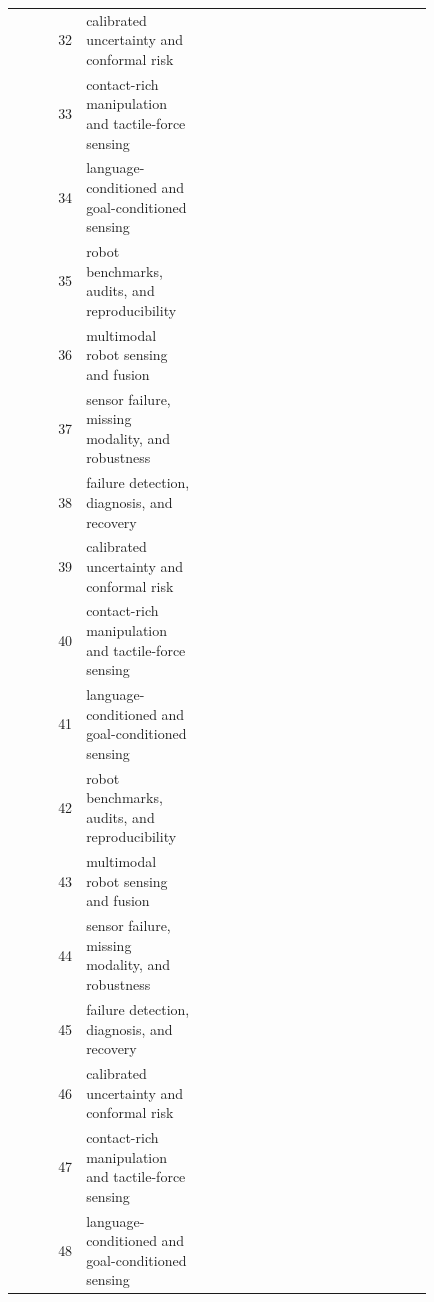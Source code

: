 \documentclass{article}
\begin{document}
\begin{longtable}{@{}r p{0.28\linewidth} p{0.55\linewidth}@{}}
32 & calibrated uncertainty and conformal risk & \citep{rader2017highly94,teller2008robust95,yue2026lowstrain96} \\
33 & contact-rich manipulation and tactile-force sensing & \citep{luo2025research97,diakusala2026object98,graefenstein2008robust99} \\
34 & language-conditioned and goal-conditioned sensing & \citep{li2023learning100,li2024a101,ma2025a102} \\
35 & robot benchmarks, audits, and reproducibility & \citep{mi2015restoring103,duan2022multimodal104,hong2024system105} \\
36 & multimodal robot sensing and fusion & \citep{campolo2009attitude106,amato2012when107,sun2022a108} \\
37 & sensor failure, missing modality, and robustness & \citep{cardielortega2023failure109,shi2023soft110,moreira2016assessment111} \\
38 & failure detection, diagnosis, and recovery & \citep{lou2023dcyolov8112,jiang2024a113,kuo2022failure114} \\
39 & calibrated uncertainty and conformal risk & \citep{kramer2010robust115,barnett2024seven116,orozco2000an117} \\
40 & contact-rich manipulation and tactile-force sensing & \citep{savas2026statistical118,hu2026dural119,yang2023robust120} \\
41 & language-conditioned and goal-conditioned sensing & \citep{khan2024robust121,hooshmand2023wearable122,masalskyi2025hybrid123} \\
42 & robot benchmarks, audits, and reproducibility & \citep{jiao2025tpam124,murphy1999handling125,zhao2016filtering126} \\
43 & multimodal robot sensing and fusion & \citep{wu2020selfpowered127,manjakkal2021connected128,mei2006replacing129} \\
44 & sensor failure, missing modality, and robustness & \citep{munch2012failure130,boulahia2021early131,mohsenzadeh2022gear132} \\
45 & failure detection, diagnosis, and recovery & \citep{long2026sensorbased133,keum2024dualstream134,gutierrez2017a135} \\
46 & calibrated uncertainty and conformal risk & \citep{kang2021realtime136,leo2020who137,lu2025multimodal138} \\
47 & contact-rich manipulation and tactile-force sensing & \citep{cai2023a139,bocus2022operanet140,makarenko2003scalable141} \\
48 & language-conditioned and goal-conditioned sensing & \citep{zandigohar2024multimodal142,cordie2024enabling143,mao2024a144} \\

\end{longtable}
\end{document}
